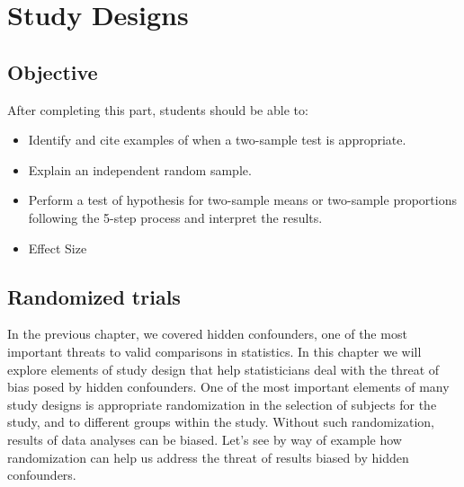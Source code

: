 \documentclass[11pt, chapterprefix=true]{scrbook}\usepackage[]{graphicx}\usepackage[]{color}
\begin{document}
\begin{exercises}
%

\end{exercises}
\onecolumn



\chapter{Study Designs}
\label{chap:ch5}

\section{Objective}

After completing this part, students should be able to:

\colorbox{lyellow}{\parbox{14cm}{

\begin{itemize}
\item Identify and cite examples of when a two-sample test is appropriate.
\item Explain an independent random sample.
\item Perform a test of hypothesis for two-sample means or two-sample
proportions following the 5-step process and interpret the results.
\item Effect Size
\end{itemize}
}}

\section{Randomized trials}

In the previous chapter, we covered hidden confounders, one of the most important threats to valid comparisons in statistics. In this chapter we will explore elements of study design that help statisticians deal with the threat of bias posed by hidden confounders. One of the most important elements of many study designs is appropriate randomization in the selection of subjects for the study, and to different groups within the study. Without such randomization, results of data analyses can be biased. Let's see by way of example how randomization can help us address the threat of results biased by hidden confounders.
\end{document}

